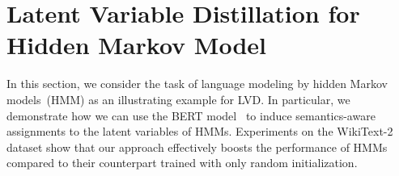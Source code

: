\documentclass{article} %
\begin{document}







\section{Latent Variable Distillation for Hidden Markov Model}
\label{sec:hmm}
In this section, we consider the task of language modeling by hidden Markov models~(HMM) as an illustrating example for LVD. In particular, we demonstrate how we can use the BERT model~\citep{devlin2019bert} to induce semantics-aware assignments to the latent variables of HMMs. Experiments on the WikiText-2~\citep{merity2016pointer} dataset show that our approach effectively boosts the performance of HMMs compared to their counterpart trained with only random initialization.
\end{document}
